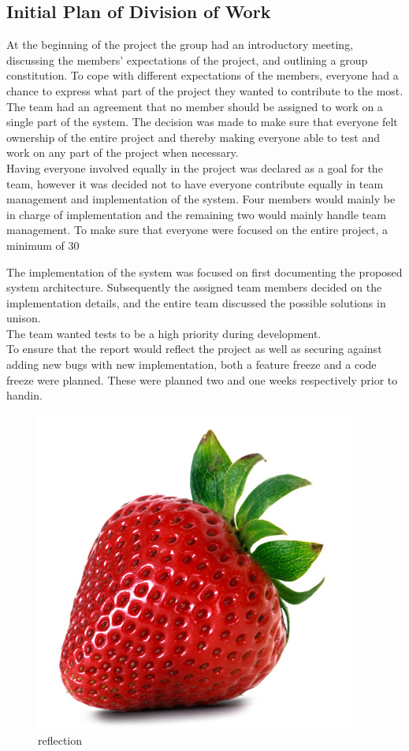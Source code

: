 \subsection{Initial Plan of Division of Work}
At the beginning of the project the group had an introductory meeting, discussing the members’ expectations of the project, and outlining a group constitution. \newline
To cope with different expectations of the members, everyone had a chance to express what part of the project they wanted to contribute to the most. The team had an agreement that no member should be assigned to work on a single part of the system. The decision was made to make sure that everyone felt ownership of the entire project and thereby making everyone able to test and work on any part of the project when necessary. \\

Having everyone involved equally in the project was declared as a goal for the team, however it was decided not to have everyone contribute equally in team management and implementation of the system. Four members would mainly be in charge of implementation and the remaining two would mainly handle team management. To make sure that everyone were focused on the entire project, a minimum of 30%

The implementation of the system was focused on first documenting the proposed system architecture. Subsequently the assigned team members decided on the implementation details, and the entire team discussed the possible solutions in unison.\\

The team wanted tests to be a high priority during development.\\

To ensure that the report would reflect the project as well as securing against adding new bugs with new implementation, both a feature freeze and a code freeze were planned. These were planned two and one weeks respectively prior to handin.\\

\begin{figure}
\centering
\includegraphics[width=0.5\linewidth]{Figures/strawberry.png}
\caption{reflection}
\end{figure}

